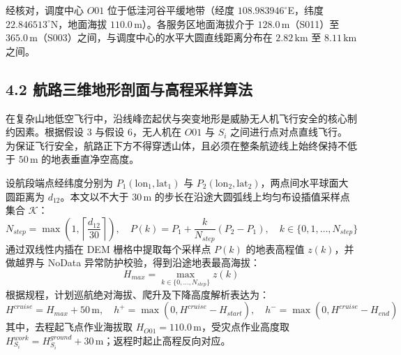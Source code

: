 \documentclass[withoutpreface,bwprint]{format}
\begin{document}
经核对，调度中心 $O01$ 位于低洼河谷平缓地带（经度 $108.983946^\circ$E，纬度 $22.846513^\circ$N，地面海拔 $110.0\,\text{m}$）。各服务区地面海拔介于 $128.0\,\text{m}$（S011）至 $365.0\,\text{m}$（S003）之间，与调度中心的水平大圆直线距离分布在 $2.82\,\text{km}$ 至 $8.11\,\text{km}$ 之间。

\subsection{4.2 航路三维地形剖面与高程采样算法}
在复杂山地低空飞行中，沿线峰峦起伏与突变地形是威胁无人机飞行安全的核心制约因素\cite{roberge2013}。根据假设 3 与假设 6，无人机在 $O01$ 与 $S_i$ 之间进行点对点直线飞行。为保证飞行安全，航路正下方不得穿透山体，且必须在整条航迹线上始终保持不低于 $50\,\text{m}$ 的地表垂直净空高度。

设航段端点经纬度分别为 $P_1(\text{lon}_1, \text{lat}_1)$ 与 $P_2(\text{lon}_2, \text{lat}_2)$，两点间水平球面大圆距离为 $d_{12}$。本文以不大于 $30\,\text{m}$ 的步长在沿途大圆弧线上均匀布设插值采样点集合 $\mathcal{K}$：
\begin{equation}
N_{step} = \max\left(1, \left\lceil \frac{d_{12}}{30} \right\rceil\right), \quad P(k) = P_1 + \frac{k}{N_{step}} (P_2 - P_1), \quad k \in \{0, 1, \dots, N_{step}\}
\end{equation}
通过双线性内插在 DEM 栅格中提取每个采样点 $P(k)$ 的地表高程值 $z(k)$，并做越界与 NoData 异常防护校验，得到沿途地表最高海拔：
\begin{equation}
H_{max} = \max_{k \in \{0, \dots, N_{step}\}} z(k)
\end{equation}
根据规程，计划巡航绝对海拔、爬升及下降高度解析表达为：
\begin{equation}
H^{cruise} = H_{max} + 50\,\text{m}, \quad h^+ = \max(0, H^{cruise} - H_{start}), \quad h^- = \max(0, H^{cruise} - H_{end})
\end{equation}
其中，去程起飞点作业海拔取 $H_{O01} = 110.0\,\text{m}$，受灾点作业高度取 $H_{S_i}^{work} = H_{S_i}^{ground} + 30\,\text{m}$；返程时起止高程反向对应。
\end{document}

